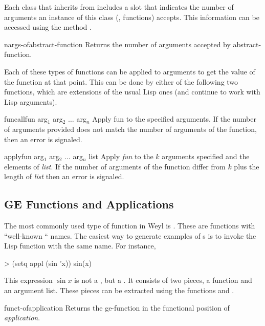Each class that inherits from  includes a
slot that indicates the number of arguments an instance of this class
(\ie, functions) accepts. This information can be accessed using the
method .
  
\begin{functiondef}{nargs-of}{abstract-function}
Returns the number of arguments accepted by {\sf abstract-function}.
\end{functiondef}
  
  Each of these types of functions can be applied to
arguments to get the value of the function at that point.
This can be done by either of the following two functions,
which are extensions of the usual Lisp ones (and continue
to work with Lisp arguments).
  
\begin{functiondef}{funcall}{fun arg$_1$ arg$_2$ $\ldots$ arg$_n$}
Apply fun to the specified arguments.  If the number of arguments
provided does not match the number of arguments of the function, then
an error is signaled.
\end{functiondef}
  
\begin{functiondef}{apply}{fun arg$_1$ arg$_2$ $\ldots$ arg$_n$ list}  
Apply {\em fun} to the $k$ arguments specified and the elements
of {\em list}.  If the number of arguments of the function
differ from $k$ plus the length of {\em list} then an error
is signaled. 
\end{functiondef}
  
\subsection{GE Functions and Applications}
  
The most commonly used type of function in Weyl is
.  These are functions with ``well-known ``
names.  The easiest way to generate examples of s
is to invoke the Lisp function with the same name.  For instance,
\begin{code}  
> (setq appl (sin 'x))
sin(x)
\end{code}
  
\noindent
This expression $\sin x$ is not a , but
a . It consists of two pieces, a function
and an argument list. These pieces can be extracted
using the functions  and .
  
\begin{functiondef}{funct-of}{application}
Returns the {\sf ge-function} in the functional position
of {\em application}.
\end{functiondef}
  
